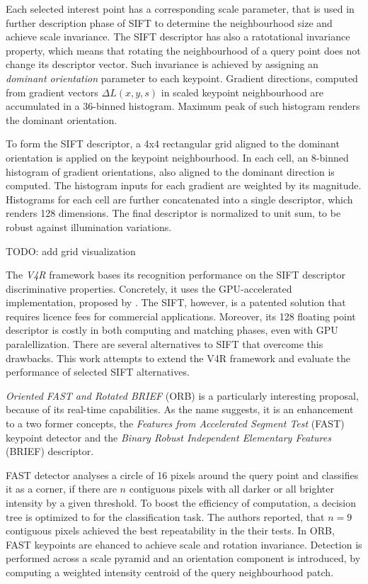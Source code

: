Each selected interest point has a corresponding scale parameter, that is used in further description phase of SIFT to determine the neighbourhood size and achieve scale invariance. The SIFT descriptor has also a ratotational invariance property, which means that rotating the neighbourhood of a query point does not change its descriptor vector. Such invariance is achieved by assigning an \textit{dominant orientation} parameter to each keypoint. Gradient directions, computed from gradient vectors $\Delta L(x,y,s)$ in scaled keypoint neighbourhood are accumulated in a 36-binned histogram. Maximum peak of such histogram renders the dominant orientation.

To form the SIFT descriptor, a 4x4 rectangular grid aligned to the dominant orientation is applied on the keypoint neighbourhood. In each cell, an 8-binned histogram of gradient orientations, also aligned to the dominant direction is computed. The histogram inputs for each gradient are weighted by its magnitude. Histograms for each cell are further concatenated into a single descriptor, which renders 128 dimensions. The final descriptor is normalized to unit sum, to be robust against illumination variations.

TODO: add grid visualization

The \textit{V4R} framework bases its recognition performance on the SIFT descriptor discriminative properties. Concretely, it uses the GPU-accelerated implementation, proposed by \cite{SIFTGPU}. The SIFT, however, is a patented solution \cite{SIFT-PATENT} that requires licence fees for commercial applications. Moreover, its 128 floating point descriptor is costly in both computing and matching phases, even with GPU paralellization. There are several alternatives to SIFT that overcome this drawbacks. This work attempts to extend the V4R framework and evaluate the performance of selected SIFT alternatives.

\textit{Oriented FAST and Rotated BRIEF} (ORB) \cite{ORB} is a particularly interesting proposal, because of its real-time capabilities. As the name suggests, it is an enhancement to a two former concepts, the\textit{ Features from Accelerated Segment Test} (FAST) \cite{FAST} keypoint detector and the \textit{Binary Robust Independent
Elementary Features} (BRIEF) \cite{BRIEF} descriptor.

FAST detector analyses a circle of 16 pixels around the query point and classifies it as a corner, if there are $n$ contiguous pixels with all darker or all brighter intensity by a given threshold. To boost the efficiency of computation, a decision tree is optimized to for the classification task. The authors reported, that $n = 9$ contiguous pixels achieved the best repeatability in the their tests. In ORB, FAST keypoints are ehanced to achieve scale and rotation invariance. Detection is performed across a scale pyramid and an orientation component is introduced, by computing a weighted intensity centroid of the query neighbourhood patch. 

